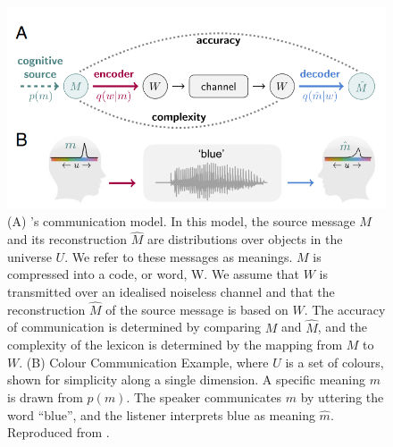 \begin{figure}[hbt!]
 \centering
 \includegraphics[width=1\textwidth]{image/lit/datacompress1.PNG}
 \caption[(A) Shannon's communication model. In this model, the source
 message $M$ and its reconstruction $\hat{M}$ are distributions over objects
 in the universe $U$. We refer to these messages as meanings. $M$ is compressed
 into a code, or word, W. We assume that $W$ is transmitted over an
 idealised noiseless channel and that the reconstruction $\hat{M}$
 of the source message is based on $W$.
 The accuracy of communication is determined by comparing $M$ and $\hat{M}$,
 and the complexity of the lexicon is determined by the mapping from $M$ to
 $W$. (B) Colour Communication Example, where $U$ is a set of colours, shown
 for simplicity along a single dimension. A specific meaning $m$ is drawn from
 $p(m)$. The speaker communicates $m$ by uttering the word “blue”, and the
 listener interprets blue as meaning $\hat{m}$] {(A)
 's communication model. In this model, the
 source message $M$ and its reconstruction $\hat{M}$ are distributions over
 objects in the universe $U$. We refer to these messages as meanings. $M$ is
 compressed into a code, or word, W. We assume that $W$ is transmitted over an
 idealised noiseless channel and that the reconstruction $\hat{M}$ of the
 source message is based on $W$. The accuracy of communication is determined by
 comparing $M$ and $\hat{M}$, and the complexity of the lexicon is determined
 by the mapping from $M$ to $W$. (B) Colour Communication Example, where $U$
 is a set of colours, shown for simplicity along a single dimension. A specific
 meaning $m$ is drawn from $p(m)$. The speaker communicates $m$ by uttering the
 word “blue”, and the listener interprets blue as meaning $\hat{m}$.
 Reproduced from .}
 \label{fig:datacompression1}
\end{figure}

